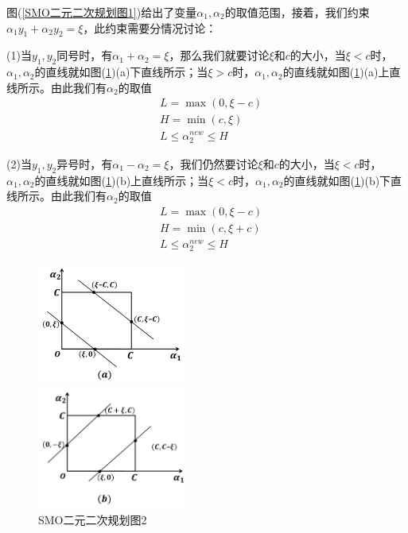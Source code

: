         图(\ref{SMO二元二次规划图1})给出了变量$\alpha_1,\alpha_2$的取值范围，接着，我们约束$\alpha_1y_1+\alpha_2y_2 = \xi$，此约束需要分情况讨论：
        \par
        (1)当$y_1,y_2$同号时，有$\alpha_1+\alpha_2 = \xi$，那么我们就要讨论$\xi $和$c$的大小，当$\xi <c$时，$\alpha_1,\alpha_2$的直线就如图(\ref{SMO二元二次规划图2})(a)下直线所示；当$\xi > c$时，$\alpha_1,\alpha_2$的直线就如图(\ref{SMO二元二次规划图2})(a)上直线所示。由此我们有$\alpha_2$的取值
        \begin{align*}
        & L = \max(0,\xi-c)\\
        & H=\min(c,\xi)\\
        & L \leqslant \alpha_2^{new} \leqslant H
        \end{align*}
        \par
        (2)当$y_1,y_2$异号时，有$\alpha_1-\alpha_2 = \xi$，我们仍然要讨论$\xi $和$c$的大小，当$\xi <c$时，$\alpha_1,\alpha_2$的直线就如图(\ref{SMO二元二次规划图2})(b)上直线所示；当$\xi < c$时，$\alpha_1,\alpha_2$的直线就如图(\ref{SMO二元二次规划图2})(b)下直线所示。由此我们有$\alpha_2$的取值
        \begin{align*}
        & L = \max(0,\xi-c)\\
        & H=\min(c,\xi+c)\\
        & L \leqslant \alpha_2^{new} \leqslant H
        \end{align*}
			\begin{figure}[H]
			  \centering
			  \begin{varwidth}[t]{\textwidth}
			    \vspace{0pt}
			    \includegraphics[height=4cm]{images/Binary_quadratic_programming1.jpg}
			  \end{varwidth}
			  \qquad
			  \begin{varwidth}[t]{\textwidth}
		    \vspace{0pt}
		    \includegraphics[height=4cm]{images/Binary_quadratic_programming2.jpg}
 		 \end{varwidth}
            \caption{SMO二元二次规划图2}
            \label{SMO二元二次规划图2}
            \end{figure}
